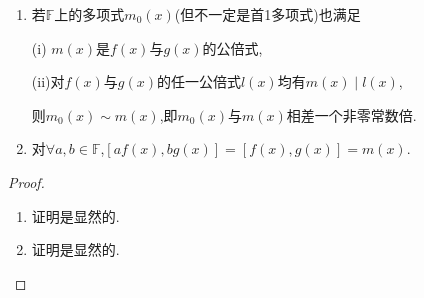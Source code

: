 \documentclass[../../main.tex]{subfiles}%
\begin{document}
\begin{proposition}\label{proposition:最小公倍式的小结论}
\begin{enumerate}[(1)]
\item 若$\mathbb{F}$上的多项式$m_0(x)$(但不一定是首1多项式)也满足

(i)\(\,\,m(x)\)是\(f(x)\)与\(g(x)\)的公倍式,

(ii)对\(f(x)\)与\(g(x)\)的任一公倍式\(l(x)\)均有\(m(x)\mid l(x)\),

则$m_0(x)\sim m(x)$,即$m_0(x)$与$m(x)$相差一个非零常数倍.

\item 对$\forall a,b\in\mathbb{F}$,$[af(x),bg(x)]=[f(x),g(x)]=m(x)$.
\end{enumerate}
\end{proposition}
\begin{proof}
\begin{enumerate}[(1)]
\item 证明是显然的.

\item 证明是显然的.
\end{enumerate}
\end{proof}
\end{document}
